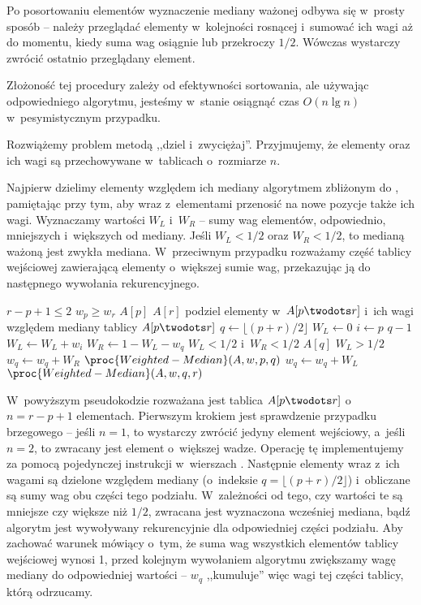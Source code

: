\subproblem %
Po posortowaniu elementów wyznaczenie mediany ważonej odbywa się w~prosty sposób -- należy przeglądać elementy w~kolejności rosnącej i~sumować ich wagi aż do momentu, kiedy suma wag osiągnie lub przekroczy $1/2$. Wówczas wystarczy zwrócić ostatnio przeglądany element.

Złożoność tej procedury zależy od efektywności sortowania, ale używając odpowiedniego algorytmu, jesteśmy w~stanie osiągnąć czas $O(n\lg n)$ w~pesymistycznym przypadku.

\subproblem %
Rozwiążemy problem metodą ,,dziel i~zwyciężaj''. Przyjmujemy, że elementy oraz ich wagi są przechowywane w~tablicach o~rozmiarze $n$.

Najpierw dzielimy elementy względem ich mediany algorytmem zbliżonym do , pamiętając przy tym, aby wraz z~elementami przenosić na nowe pozycje także ich wagi. Wyznaczamy wartości $W_L$ i~$W_R$ -- sumy wag elementów, odpowiednio, mniejszych i~większych od mediany. Jeśli $W_L<1/2$ oraz $W_R<1/2$, to medianą ważoną jest zwykła mediana. W~przeciwnym przypadku rozważamy część tablicy wejściowej zawierającą elementy o~większej sumie wag, przekazując ją do następnego wywołania rekurencyjnego.

\begin{codebox}
\li	\If $r-p+1\le2$
\li		\Then
			\If $w_p\ge w_r$ \label{li:weighted-median-boundary-case-begin}
\li				\Then \Return $A[p]$
\li				\Else \Return $A[r]$
				\End \label{li:weighted-median-boundary-case-end}
		\End
\li	podziel elementy w~$A[p\twodots r]$ i~ich wagi względem mediany tablicy $A[p\twodots r]$ \label{li:weighted-median-partition}
\li	$q\gets\lfloor(p+r)/2\rfloor$
\li	$W_L\gets0$
\li	\For $i\gets p$ \To $q-1$
\li		\Do $W_L\gets W_L+w_i$
		\End
\li	$W_R\gets1-W_L-w_q$
\li	\If $W_L<1/2$ i~$W_R<1/2$
\li		\Then \Return $A[q]$
		\End
\li	\If $W_L>1/2$
\li		\Then
			$w_q\gets w_q+W_R$
\li			\Return $\proc{Weighted-Median}(A,w,p,q)$
\li		\Else
			$w_q\gets w_q+W_L$
\li			\Return $\proc{Weighted-Median}(A,w,q,r)$
		\End
\end{codebox}

W~powyższym pseudokodzie rozważana jest tablica $A[p\twodots r]$ o~$n=r-p+1$ elementach. Pierwszym krokiem jest sprawdzenie przypadku brzegowego -- jeśli $n=1$, to wystarczy zwrócić jedyny element wejściowy, a~jeśli $n=2$, to zwracany jest element o~większej wadze. Operację tę implementujemy za pomocą pojedynczej instrukcji  w~wierszach \twodashes{\ref{li:weighted-median-boundary-case-begin}}{\ref{li:weighted-median-boundary-case-end}}. Następnie elementy wraz z~ich wagami są dzielone względem mediany (o~indeksie $q=\lfloor(p+r)/2\rfloor$) i~obliczane są sumy wag obu części tego podziału. W~zależności od tego, czy wartości te są mniejsze czy większe niż $1/2$, zwracana jest wyznaczona wcześniej mediana, bądź algorytm jest wywoływany rekurencyjnie dla odpowiedniej części podziału. Aby zachować warunek mówiący o~tym, że suma wag wszystkich elementów tablicy wejściowej wynosi 1, przed kolejnym wywołaniem algorytmu zwiększamy wagę mediany do odpowiedniej wartości -- $w_q$ ,,kumuluje'' więc wagi tej części tablicy, którą odrzucamy.

